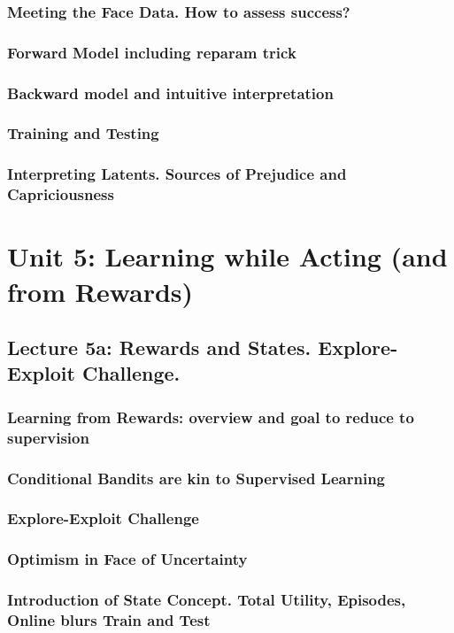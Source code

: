 \documentclass[12pt]{article}
\begin{document}
      \subsubsection*{Meeting the Face Data.  How to assess success?} %
      \subsubsection*{Forward Model including reparam trick}
      \subsubsection*{Backward model and intuitive interpretation}
      \subsubsection*{Training and Testing}
      \subsubsection*{Interpreting Latents.  Sources of Prejudice and Capriciousness}
    \newpage

  \section*{\sc Unit 5: Learning while Acting (and from Rewards)}
    \subsection*{Lecture 5a: Rewards and States.  Explore-Exploit Challenge.}
      \subsubsection*{Learning from Rewards: overview and goal to reduce to supervision}
      \subsubsection*{Conditional Bandits are kin to Supervised Learning}
      \subsubsection*{Explore-Exploit Challenge}
      \subsubsection*{Optimism in Face of Uncertainty}
      \subsubsection*{Introduction of State Concept.  Total Utility, Episodes,  Online blurs Train and Test}
    \newpage
\end{document}
